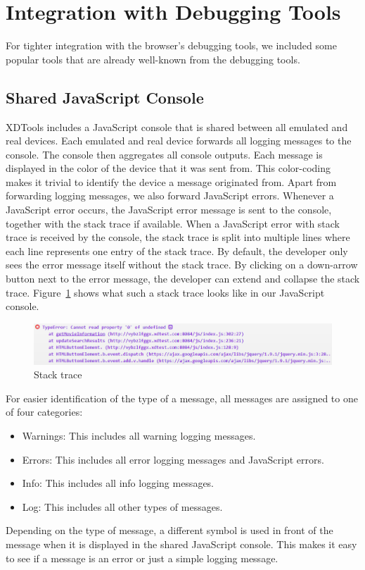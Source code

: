 \section{Integration with Debugging Tools}

For tighter integration with the browser's debugging tools, we included some popular tools that are already well-known from the debugging tools.

\subsection{Shared JavaScript Console}

XDTools includes a JavaScript console that is shared between all emulated and real devices. Each emulated and real device forwards all logging messages to the console. The console then aggregates all console outputs. Each message is displayed in the color of the device that it was sent from. This color-coding makes it trivial to identify the device a message originated from. Apart from forwarding logging messages, we also forward JavaScript errors. Whenever a JavaScript error occurs, the JavaScript error message is sent to the console, together with the stack trace if available. When a JavaScript error with stack trace is received by the console, the stack trace is split into multiple lines where each line represents one entry of the stack trace. By default, the developer only sees the error message itself without the stack trace. By clicking on a down-arrow button next to the error message, the developer can extend and collapse the stack trace. Figure~\ref{fig:stack_trace} shows what such a stack trace looks like in our JavaScript console.

\begin{figure}[H]
  \centering
    \includegraphics[width=1.0\textwidth]{images/screenshots/stack_trace_4.png}
	\caption[Screenshot: Stack trace]{Stack trace}
	\label{fig:stack_trace}
\end{figure}

For easier identification of the type of a message, all messages are assigned to one of four categories:
\begin{itemize}
	\item Warnings: This includes all warning logging messages.
	\item Errors: This includes all error logging messages and JavaScript errors.
	\item Info: This includes all info logging messages.
	\item Log: This includes all other types of messages.
\end{itemize}
Depending on the type of message, a different symbol is used in front of the message when it is displayed in the shared JavaScript console. This makes it easy to see if a message is an error or just a simple logging message.

